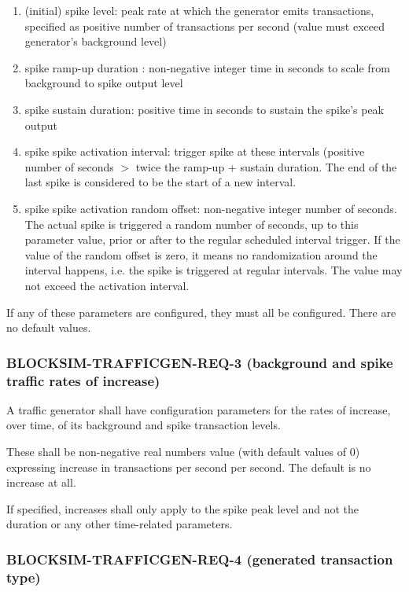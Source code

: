 \documentclass{scrreprt}
\begin{document}
\begin{enumerate}
   \item (initial) spike level: peak rate at which the generator emits transactions, specified as positive number of transactions per second (value must exceed generator's background level)
   \item spike ramp-up duration : non-negative integer time in seconds to scale from background to spike output level
   \item spike sustain duration: positive time in seconds to sustain the spike's peak output
   \item spike spike activation interval: trigger spike at these intervals (positive number of seconds $>$ twice the ramp-up + sustain duration. The end of the last spike is considered to be the start of a new interval.
   \item spike spike activation random offset: non-negative integer number of seconds. The actual spike is triggered a random number of seconds, up to this parameter value, prior or after to the regular scheduled interval trigger. If the value of the random offset is zero, it means no randomization around the interval happens, i.e. the spike is triggered at regular intervals. The value may not exceed the activation interval.
\end{enumerate}

If any of these parameters are configured, they must all be configured.
There are no default values.


\subsubsection{BLOCKSIM-TRAFFICGEN-REQ-3 (background and spike traffic rates of increase)}

A traffic generator shall have configuration parameters for the rates
of increase, over time, of its background and spike transaction levels.

These shall be non-negative real numbers value (with default values of 0)
expressing increase in transactions per second per second. The default
is no increase at all.

If specified, increases shall only apply to the spike peak level and not the
duration or any other time-related parameters.


\subsubsection{BLOCKSIM-TRAFFICGEN-REQ-4 (generated transaction type)}
\end{document}

